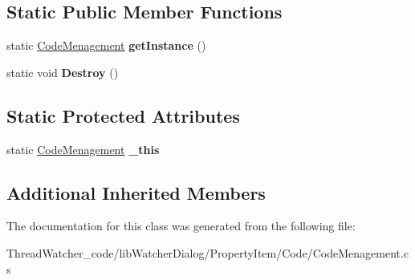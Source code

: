\subsection*{Static Public Member Functions}
\begin{DoxyCompactItemize}
\item 
\hypertarget{classlib_watcher_dialog_1_1_property_item_1_1_code_1_1_code_menagement_afc189c4778677ba245c6dae893965015}{static \hyperlink{classlib_watcher_dialog_1_1_property_item_1_1_code_1_1_code_menagement}{Code\+Menagement} {\bfseries get\+Instance} ()}\label{classlib_watcher_dialog_1_1_property_item_1_1_code_1_1_code_menagement_afc189c4778677ba245c6dae893965015}

\item 
\hypertarget{classlib_watcher_dialog_1_1_property_item_1_1_code_1_1_code_menagement_ad89e3a487e69562f678acd04acbad71e}{static void {\bfseries Destroy} ()}\label{classlib_watcher_dialog_1_1_property_item_1_1_code_1_1_code_menagement_ad89e3a487e69562f678acd04acbad71e}

\end{DoxyCompactItemize}
\subsection*{Static Protected Attributes}
\begin{DoxyCompactItemize}
\item 
\hypertarget{classlib_watcher_dialog_1_1_property_item_1_1_code_1_1_code_menagement_a3f14382ec6174e1dfb0e5927bb9d0e28}{static \hyperlink{classlib_watcher_dialog_1_1_property_item_1_1_code_1_1_code_menagement}{Code\+Menagement} {\bfseries \+\_\+this}}\label{classlib_watcher_dialog_1_1_property_item_1_1_code_1_1_code_menagement_a3f14382ec6174e1dfb0e5927bb9d0e28}

\end{DoxyCompactItemize}
\subsection*{Additional Inherited Members}


The documentation for this class was generated from the following file\+:\begin{DoxyCompactItemize}
\item 
Thread\+Watcher\+\_\+code/lib\+Watcher\+Dialog/\+Property\+Item/\+Code/Code\+Menagement.\+cs\end{DoxyCompactItemize}

